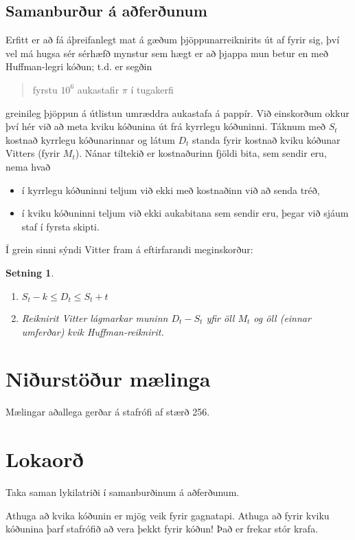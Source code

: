\documentclass[a4paper,icelandic]{article}
\theoremstyle{default}
\newtheorem{setn}{Setning}[section]
\theoremstyle{definition}
\theoremstyle{remark}
\begin{document}
\subsection{Samanburður á aðferðunum}
Erfitt er að fá áþreifanlegt mat á gæðum þjöppunarreiknirits út af fyrir
sig, því vel má hugsa sér sérhæfð mynstur sem hægt er að þjappa mun
betur en með Huffman-legri kóðun; t.d. er segðin
\begin{quote}
  fyrstu $10^6$ aukastafir $\pi$ í tugakerfi
\end{quote}
greinileg þjöppun á útlistun umræddra aukastafa á pappír. Við einskorðum
okkur því hér við að meta kviku kóðunina út frá kyrrlegu kóðuninni.
Táknum með $S_t$ kostnað kyrrlegu kóðunarinnar og látum $D_t$ standa
fyrir kostnað kviku kóðunar Vitters (fyrir $M_t$). Nánar tiltekið er
kostnaðurinn fjöldi bita, sem sendir eru, nema hvað
\begin{itemize}
  \item í kyrrlegu kóðuninni teljum við ekki með kostnaðinn við að senda
    tréð,
  \item í kviku kóðuninni teljum við ekki aukabitana sem sendir eru,
    þegar við sjáum staf í fyrsta skipti.
\end{itemize}
Í grein sinni \cite{vitter87} sýndi Vitter fram á eftirfarandi
meginskorður:
\begin{setn}\label{setn:diff}
  \begin{enumerate}
    \item $S_t - k \leq D_t \leq S_t + t$
    \item Reiknirit Vitter lágmarkar muninn $D_t - S_t$ yfir öll $M_t$
      og öll (einnar umferðar) kvik Huffman-reiknirit. 
  \end{enumerate}
\end{setn}

\section{Niðurstöður mælinga}\label{sec:maelingar}
Mælingar aðallega gerðar á stafrófi af stærð 256.

\section{Lokaorð}
Taka saman lykilatriði í samanburðinum á aðferðunum.

Athuga að kvika kóðunin er mjög veik fyrir gagnatapi.
Athuga að fyrir kviku kóðunina þarf stafrófið að vera þekkt fyrir kóðun!
Það er frekar stór krafa.
\end{document}
